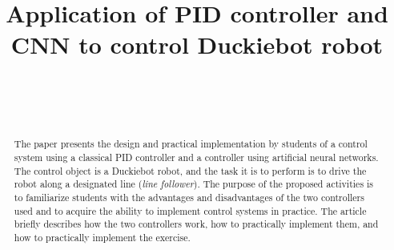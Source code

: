 \documentclass[conference]{IEEEtran}
\begin{document}
%
\title{Application of PID controller and CNN to control Duckiebot robot}


\author{
\\[0.4cm]
\and
{}
\\
}


\maketitle              %

\begin{abstract}
The paper presents the design and practical implementation by students of a control system
using a classical PID controller and a controller using artificial neural networks.
The control object is a Duckiebot robot, and the task it is to perform is to drive the robot along a designated line (\emph{line follower}). The purpose of the proposed activities is to familiarize students with the advantages and disadvantages of the two controllers used and to acquire the ability to implement control systems in practice. 
The article briefly describes how the two controllers work, how to practically implement them, and how to practically implement the exercise. 
\end{abstract}
\end{document}
